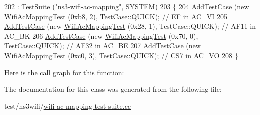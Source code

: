 \begin{DoxyCode}
202   : \hyperlink{classns3_1_1TestSuite_a904b0c40583b744d30908aeb94636d1a}{TestSuite} (\textcolor{stringliteral}{"ns3-wifi-ac-mapping"}, \hyperlink{classns3_1_1TestSuite_a1ebfcab34ec8161e085e8e3a1855eae0a90c5529a26ab3a5ffcc6e57040dbd82e}{SYSTEM})
203 \{
204   \hyperlink{classns3_1_1TestCase_a3718088e3eefd5d6454569d2e0ddd835}{AddTestCase} (\textcolor{keyword}{new} \hyperlink{classWifiAcMappingTest}{WifiAcMappingTest} (0xb8, 2), TestCase::QUICK); \textcolor{comment}{// EF in
       AC\_VI}
205   \hyperlink{classns3_1_1TestCase_a3718088e3eefd5d6454569d2e0ddd835}{AddTestCase} (\textcolor{keyword}{new} \hyperlink{classWifiAcMappingTest}{WifiAcMappingTest} (0x28, 1), TestCase::QUICK); \textcolor{comment}{// AF11 in
       AC\_BK}
206   \hyperlink{classns3_1_1TestCase_a3718088e3eefd5d6454569d2e0ddd835}{AddTestCase} (\textcolor{keyword}{new} \hyperlink{classWifiAcMappingTest}{WifiAcMappingTest} (0x70, 0), TestCase::QUICK); \textcolor{comment}{// AF32 in
       AC\_BE}
207   \hyperlink{classns3_1_1TestCase_a3718088e3eefd5d6454569d2e0ddd835}{AddTestCase} (\textcolor{keyword}{new} \hyperlink{classWifiAcMappingTest}{WifiAcMappingTest} (0xc0, 3), TestCase::QUICK); \textcolor{comment}{// CS7 in
       AC\_VO}
208 \}
\end{DoxyCode}


Here is the call graph for this function\+:




The documentation for this class was generated from the following file\+:\begin{DoxyCompactItemize}
\item 
test/ns3wifi/\hyperlink{wifi-ac-mapping-test-suite_8cc}{wifi-\/ac-\/mapping-\/test-\/suite.\+cc}\end{DoxyCompactItemize}
